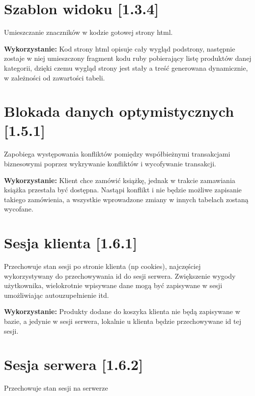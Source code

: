 \documentclass[pdflatex,11pt]{aghdpl}
\begin{document}

\section{Szablon widoku [1.3.4]}

Umieszczanie znaczników w kodzie gotowej strony html.

\textbf{Wykorzystanie:} Kod strony html opisuje cały wygląd podstrony, następnie zostaje w niej umieszczony fragment kodu ruby pobierający listę produktów danej kategorii, dzięki czemu wygląd strony jest stały a treść generowana dynamicznie, w zależności od zawartości tabeli.


\section{Blokada danych optymistycznych [1.5.1]}

Zapobiega występowania konfliktów pomiędzy współbieżnymi transakcjami biznesowymi poprzez wykrywanie konfliktów i wycofywanie transakcji.

\textbf{Wykorzystanie:} Klient chce zamówić książkę, jednak w trakcie zamawiania książka przestała być dostępna. Nastąpi konflikt i nie będzie możliwe zapisanie takiego zamówienia, a wszystkie wprowadzone zmiany w innych tabelach zostaną wycofane.


\section{Sesja klienta [1.6.1]}

Przechowuje stan sesji po stronie klienta (np cookies), najczęściej wykorzystywany do przechowywania id do sesji serwera. Zwiększenie wygody użytkownika, wielokrotnie wpisywane dane mogą być zapisywane w sesji umożliwiając autouzupełnienie itd.

\textbf{Wykorzystanie:} Produkty dodane do koszyka klienta nie będą zapisywane w bazie, a jedynie w sesji serwera, lokalnie u klienta będzie przechowywane id tej sesji.


\section{Sesja serwera [1.6.2]}

Przechowuje stan sesji na serwerze
\end{document}
